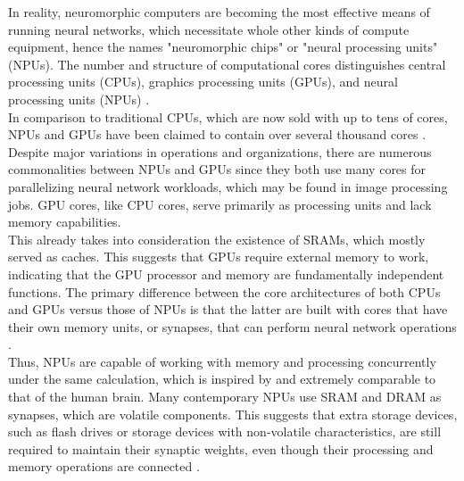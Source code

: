 \noindent In reality, neuromorphic computers are becoming the most effective means of running neural networks, which necessitate whole other kinds of compute equipment, hence the names "neuromorphic chips" or "neural processing units" (NPUs). The number and structure of computational cores distinguishes central processing units (CPUs), graphics processing units (GPUs), and neural processing units (NPUs) \cite{taha2013exploring}. \\

\noindent In comparison to traditional CPUs, which are now sold with up to tens of cores, NPUs and GPUs have been claimed to contain over several thousand cores \cite{gupta2011performance}. Despite major variations in operations and organizations, there are numerous commonalities between NPUs and GPUs since they both use many cores for parallelizing neural network workloads, which may be found in image processing jobs. GPU cores, like CPU cores, serve primarily as processing units and lack memory capabilities. \\

\noindent This already takes into consideration the existence of SRAMs, which mostly served as caches. This suggests that GPUs require external memory to work, indicating that the GPU processor and memory are fundamentally independent functions. The primary difference between the core architectures of both CPUs and GPUs versus those of NPUs is that the latter are built with cores that have their own memory units, or synapses, that can perform neural network operations \cite{qiao2015reconfigurable}. \\

\noindent Thus, NPUs are capable of working with memory and processing concurrently under the same calculation, which is inspired by and extremely comparable to that of the human brain. Many contemporary NPUs use SRAM and DRAM as synapses, which are volatile components. This suggests that extra storage devices, such as flash drives or storage devices with non-volatile characteristics, are still required to maintain their synaptic weights, even though their processing and memory operations are connected \cite{chen201865nm}. \\

